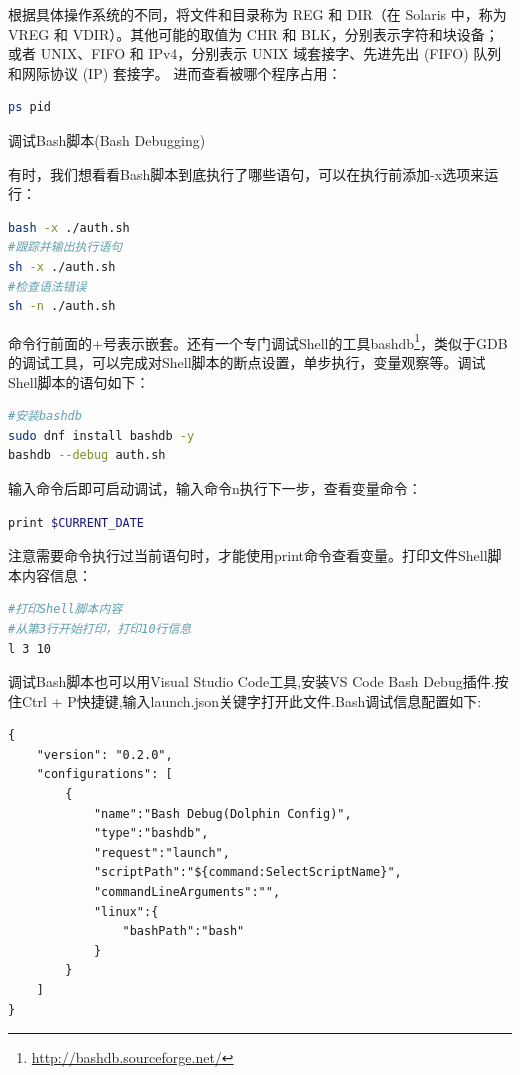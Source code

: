 \documentclass[12pt]{book}
\makeatletter
\numberwithin{dummy}{section}
\theoremstyle{ocrenumbox}
\theoremstyle{blacknumex}
\theoremstyle{blacknumbox}
\theoremstyle{ocrenum}
\renewcommand{\subsection}{\@startsection {subsection}{2}{\z@}
	{-3ex \@plus -0.1ex \@minus -.4ex}
	{0.5ex \@plus.2ex }
	{\normalfont\sffamily\bfseries}}
\makeatother
\begin{document}
根据具体操作系统的不同，将文件和目录称为 REG 和 DIR（在 Solaris 中，称为 VREG 和 VDIR）。其他可能的取值为 CHR 和 BLK，分别表示字符和块设备；或者 UNIX、FIFO 和 IPv4，分别表示 UNIX 域套接字、先进先出 (FIFO) 队列和网际协议 (IP) 套接字。
进而查看被哪个程序占用：

\begin{lstlisting}[language=Bash]
ps pid
\end{lstlisting}

\subsection{调试Bash脚本(Bash Debugging)}

有时，我们想看看Bash脚本到底执行了哪些语句，可以在执行前添加-x选项来运行：

\begin{lstlisting}[language=Bash]
bash -x ./auth.sh
#跟踪并输出执行语句
sh -x ./auth.sh
#检查语法错误
sh -n ./auth.sh
\end{lstlisting}

命令行前面的+号表示嵌套。还有一个专门调试Shell的工具bashdb\footnote{\url{http://bashdb.sourceforge.net/}}，类似于GDB的调试工具，可以完成对Shell脚本的断点设置，单步执行，变量观察等。调试Shell脚本的语句如下：

\begin{lstlisting}[language=Bash]
#安装bashdb
sudo dnf install bashdb -y
bashdb --debug auth.sh
\end{lstlisting}

输入命令后即可启动调试，输入命令n执行下一步，查看变量命令：

\begin{lstlisting}[language=Bash]
print $CURRENT_DATE
\end{lstlisting}

注意需要命令执行过当前语句时，才能使用print命令查看变量。打印文件Shell脚本内容信息：

\begin{lstlisting}[language=Bash]
#打印Shell脚本内容
#从第3行开始打印，打印10行信息
l 3 10 
\end{lstlisting}

调试Bash脚本也可以用Visual Studio Code工具,安装VS Code Bash Debug插件.按住Ctrl + P快捷键,输入launch.json关键字打开此文件.Bash调试信息配置如下:

\begin{lstlisting}
{
	"version": "0.2.0",
	"configurations": [
		{
			"name":"Bash Debug(Dolphin Config)",
			"type":"bashdb",
			"request":"launch",
			"scriptPath":"${command:SelectScriptName}",
			"commandLineArguments":"",
			"linux":{
				"bashPath":"bash"
			}
		}
	]
}
\end{lstlisting}
\end{document}
